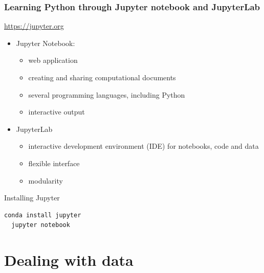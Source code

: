 \documentclass{beamer}
\begin{document}
\begin{frame}
  \frametitle{Learning Python through Jupyter notebook and JupyterLab}
  \url{https://jupyter.org}
  \begin{itemize}
      \item Jupyter Notebook:
      \begin{itemize}
        \item web application
        \item creating and sharing computational documents
        \item several programming languages, including Python
        \item interactive output 
      \end{itemize}
      \item JupyterLab
      \begin{itemize}
        \item interactive development environment (IDE) for notebooks, code and data
        \item flexible interface
        \item modularity
      \end{itemize}
  \end{itemize}
\end{frame}

\begin{frame}[fragile]{Installing Jupyter}



  \begin{lstlisting}[language=bash,caption={installing and executing Jupyter notebook},frame=single]
  conda install jupyter
  jupyter notebook
\end{lstlisting}

\end{frame}
\section{Dealing with data} %
\end{document}
